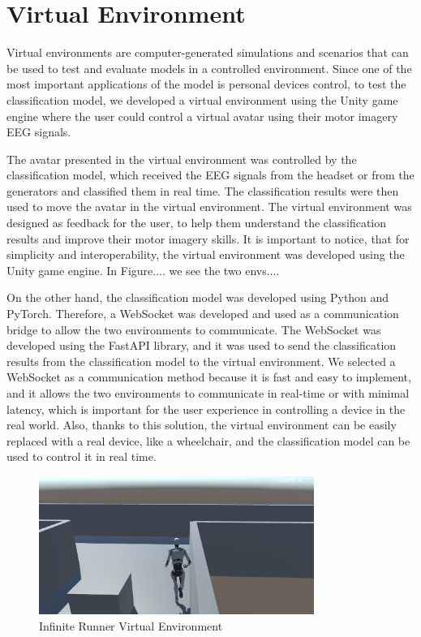 \section{Virtual Environment}
Virtual environments are computer-generated simulations and scenarios that can be used to test and evaluate models in a controlled environment.
Since one of the most important applications of the model is personal devices control, to test the classification model, we developed a virtual environment using the Unity game engine where the user could control a virtual avatar using their motor imagery EEG signals.

The avatar presented in the virtual environment was controlled by the classification model, which received the EEG signals from the headset or from the generators and classified them in real time.
The classification results were then used to move the avatar in the virtual environment.
%
The virtual environment was designed as feedback for the user, to help them understand the classification results and improve their motor imagery skills.
It is important to notice, that for simplicity and interoperability, the virtual environment was developed using the Unity game engine.
In Figure.... we see the two envs....

On the other hand, the classification model was developed using Python and PyTorch.
Therefore, a WebSocket was developed and used as a communication bridge to allow the two environments to communicate.
%
The WebSocket was developed using the FastAPI library, and it was used to send the classification results from the classification model to the virtual environment.
We selected a WebSocket as a communication method because it is fast and easy to implement, and it allows the two environments to communicate in real-time or with minimal latency, which is important for the user experience in controlling a device in the real world.
Also, thanks to this solution, the virtual environment can be easily replaced with a real device, like a wheelchair, and the classification model can be used to control it in real time.
\begin{figure}[!htbp]
    \centering
    \includegraphics[width=0.8\textwidth]{Figures/Approach/infinite_runner}
    \caption{Infinite Runner Virtual Environment}
    \label{fig:infinite_runner}
\end{figure}

